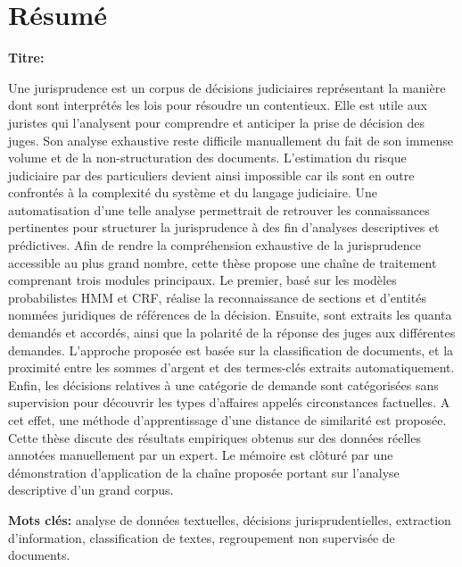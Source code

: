 \chapter*{Résumé}
\textbf{Titre:} \textsc{\titlefr}

Une jurisprudence est un corpus de décisions judiciaires représentant la manière dont sont interprétés les lois pour résoudre un contentieux. Elle est utile aux juristes qui l'analysent pour comprendre et anticiper la prise de décision des juges. Son analyse exhaustive reste difficile manuallement du fait de son immense volume et de la non-structuration des documents. L'estimation du risque judiciaire par des particuliers devient ainsi impossible car ils sont en outre confrontés à la complexité du système et du langage judiciaire. Une automatisation d'une telle analyse permettrait de retrouver les connaissances pertinentes pour structurer la jurisprudence à des fin d'analyses descriptives et prédictives.  
Afin de rendre la compréhension exhaustive de la jurisprudence accessible au plus grand nombre, cette thèse propose une chaîne de traitement comprenant trois modules principaux. Le premier, basé sur les modèles probabilistes HMM et CRF, réalise la reconnaissance de sections et d'entités nommées juridiques de références de la décision. Ensuite, sont extraits les quanta demandés et accordés, ainsi que la polarité de la réponse des juges aux différentes demandes. L'approche proposée est basée sur la classification de documents, et la proximité entre les sommes d'argent et des termes-clés extraits automatiquement. Enfin, les décisions relatives à une catégorie de demande sont catégorisées sans supervision pour découvrir les types d'affaires appelés circonstances factuelles. A cet effet, une méthode d'apprentissage d'une distance de similarité est proposée.
Cette thèse discute des résultats empiriques obtenus sur des données réelles annotées manuellement par un expert. Le mémoire est clôturé par une démonstration d'application de la chaîne proposée portant sur l'analyse descriptive d'un grand corpus.

\textbf{Mots clés:} analyse de données textuelles, décisions jurisprudentielles, extraction d'information, classification de textes, regroupement non supervisée de documents.
